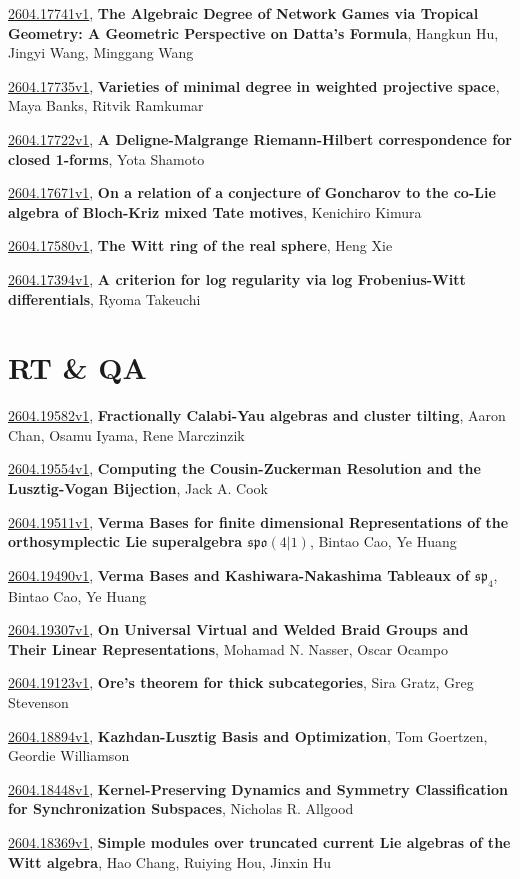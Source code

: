 \documentclass[9pt, a4paper]{article}
\theoremstyle{plain}
\theoremstyle{definition}
\theoremstyle{remark}
\newcommand{\arxiv}[3]{\href{https://arxiv.org/abs/#1}{#1}, \textbf{\textcolor{arxivblue}{#2}}, #3}
\begin{document}
\arxiv{2604.17741v1}{The Algebraic Degree of Network Games via Tropical Geometry: A Geometric Perspective on Datta's Formula}{Hangkun Hu, Jingyi Wang, Minggang Wang}

\arxiv{2604.17735v1}{Varieties of minimal degree in weighted projective space}{Maya Banks, Ritvik Ramkumar}

\arxiv{2604.17722v1}{A Deligne-Malgrange Riemann-Hilbert correspondence for closed 1-forms}{Yota Shamoto}

\arxiv{2604.17671v1}{On a relation of a conjecture of Goncharov to the co-Lie algebra of Bloch-Kriz mixed Tate motives}{Kenichiro Kimura}

\arxiv{2604.17580v1}{The Witt ring of the real sphere}{Heng Xie}

\arxiv{2604.17394v1}{A criterion for log regularity via log Frobenius-Witt differentials}{Ryoma Takeuchi}


\section{RT \& QA}
\arxiv{2604.19582v1}{Fractionally Calabi-Yau algebras and cluster tilting}{Aaron Chan, Osamu Iyama, Rene Marczinzik}

\arxiv{2604.19554v1}{Computing the Cousin-Zuckerman Resolution and the Lusztig-Vogan Bijection}{Jack A. Cook}

\arxiv{2604.19511v1}{Verma Bases for finite dimensional Representations of the orthosymplectic Lie superalgebra $\mathfrak{spo}(4|1)$}{Bintao Cao, Ye Huang}

\arxiv{2604.19490v1}{Verma Bases and Kashiwara-Nakashima Tableaux of $\mathfrak{sp}_4$}{Bintao Cao, Ye Huang}

\arxiv{2604.19307v1}{On Universal Virtual and Welded Braid Groups and Their Linear Representations}{Mohamad N. Nasser, Oscar Ocampo}

\arxiv{2604.19123v1}{Ore's theorem for thick subcategories}{Sira Gratz, Greg Stevenson}

\arxiv{2604.18894v1}{Kazhdan-Lusztig Basis and Optimization}{Tom Goertzen, Geordie Williamson}

\arxiv{2604.18448v1}{Kernel-Preserving Dynamics and Symmetry Classification for Synchronization Subspaces}{Nicholas R. Allgood}

\arxiv{2604.18369v1}{Simple modules over truncated current Lie algebras of the Witt algebra}{Hao Chang, Ruiying Hou, Jinxin Hu}
\end{document}

